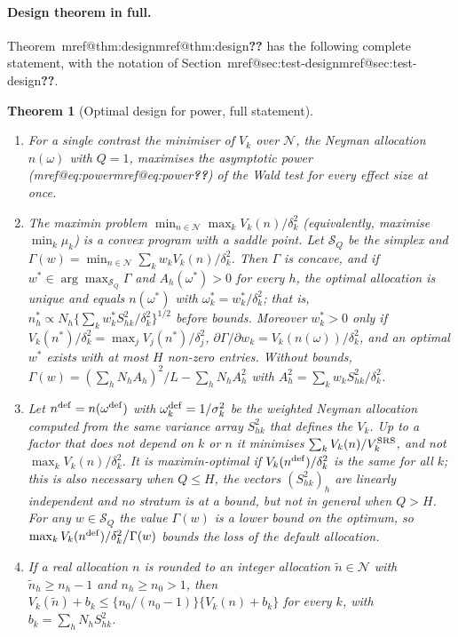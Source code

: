 \documentclass[pdflatex,sn-mathphys-num,iicol]{sn-jnl}
\makeatletter
\theoremstyle{thmstyleone}
\newtheorem{theorem}[proposition]{Theorem}
\theoremstyle{thmstyletwo}
\theoremstyle{thmstylethree}
\newcommand{\Mref}[1]{\ifcsname mref@#1\endcsname\csname mref@#1\endcsname\else\textbf{??}\fi}
\makeatother
\begin{document}
\paragraph{Design theorem in full.} Theorem~\Mref{thm:design} has the following complete statement, with the notation of Section~\Mref{sec:test-design}.
\begin{theorem}[Optimal design for power, full statement]\label{thm:design-full}
\begin{enumerate}
\item[(a)] For a single contrast the minimiser of $V_k$ over $\mathcal N$, the Neyman allocation $n(\omega)$ with $Q=1$, maximises the asymptotic power (\Mref{eq:power}) of the Wald test for every effect size at once.
\item[(b)] The maximin problem $\min_{n\in\mathcal N}\max_kV_k(n)/\delta_k^2$ (equivalently, maximise $\min_k\mu_k$) is a convex program with a saddle point. Let $\mathcal S_Q$ be the simplex and $\Gamma(w)=\min_{n\in\mathcal N}\sum_kw_kV_k(n)/\delta_k^2$. Then $\Gamma$ is concave, and if $w^\ast\in\arg\max_{\mathcal S_Q}\Gamma$ and $A_h(\omega^\ast)>0$ for every $h$, the optimal allocation is unique and equals $n(\omega^\ast)$ with $\omega^\ast_k=w^\ast_k/\delta_k^2$; that is, $n^\ast_h\propto N_h\{\sum_kw^\ast_kS^2_{hk}/\delta_k^2\}^{1/2}$ before bounds. Moreover $w^\ast_k>0$ only if $V_k(n^\ast)/\delta_k^2=\max_jV_j(n^\ast)/\delta_j^2$, $\partial\Gamma/\partial w_k=V_k(n(\omega))/\delta_k^2$, and an optimal $w^\ast$ exists with at most $H$ non-zero entries. Without bounds, $\Gamma(w)=(\sum_hN_hA_h)^2/L-\sum_hN_hA_h^2$ with $A_h^2=\sum_kw_kS^2_{hk}/\delta_k^2$.
\item[(c)] Let $n^{\rm def}=n(\omega^{\rm def})$ with $\omega^{\rm def}_k=1/\sigma_k^2$ be the weighted Neyman allocation computed from the same variance array $S^2_{hk}$ that defines the $V_k$. Up to a factor that does not depend on $k$ or $n$ it minimises $\sum_kV_k(n)/V^{\rm SRS}_k$, and not $\max_kV_k(n)/\delta_k^2$. It is maximin-optimal if $V_k(n^{\rm def})/\delta_k^2$ is the same for all $k$; this is also necessary when $Q\le H$, the vectors $(S^2_{hk})_h$ are linearly independent and no stratum is at a bound, but not in general when $Q>H$. For any $w\in\mathcal S_Q$ the value $\Gamma(w)$ is a lower bound on the optimum, so $\max_kV_k(n^{\rm def})/\delta_k^2\big/\Gamma(w)$ bounds the loss of the default allocation.
\item[(d)] If a real allocation $n$ is rounded to an integer allocation $\tilde n\in\mathcal N$ with $\tilde n_h\ge n_h-1$ and $n_h\ge n_0>1$, then $V_k(\tilde n)+b_k\le\{n_0/(n_0-1)\}\{V_k(n)+b_k\}$ for every $k$, with $b_k=\sum_hN_hS^2_{hk}$.
\end{enumerate}
\end{theorem}
\end{document}
